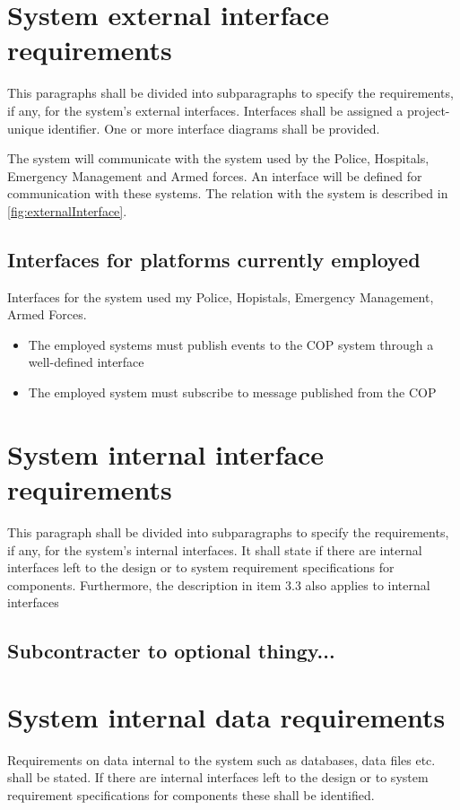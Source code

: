 \section{System external interface requirements}
This paragraphs shall be divided into subparagraphs to specify the requirements, if any, for the system’s external interfaces. Interfaces shall be assigned a project-unique identifier. One or more interface diagrams shall be provided.

The system will communicate with the system used by the Police, Hospitals, Emergency Management and Armed forces. An interface will be defined for communication with these systems. The relation with the system is described in \ref{fig:externalInterface}.


\subsection{Interfaces for platforms currently employed}
Interfaces for the system used my Police, Hopistals, Emergency Management, Armed Forces.
\begin{itemize}
	\item The employed systems must publish events to the COP system through a well-defined interface
	\item The employed system must  subscribe to message published from the COP
\end{itemize}

\section{System internal interface requirements}
This paragraph shall be divided into subparagraphs to specify the requirements, if any, for the system’s internal interfaces. It shall state if there are internal interfaces left to the design or to system requirement specifications for components. Furthermore, the description in item 3.3 also applies to internal interfaces

\subsection{Subcontracter to optional thingy...}

\section{System internal data requirements}
Requirements on data internal to the system such as databases, data files etc. shall be stated. If there are internal interfaces left to the design or to system requirement specifications for components these shall be identified.

